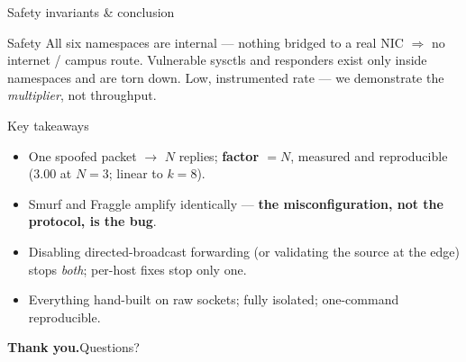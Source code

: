 \documentclass[aspectratio=169,10pt]{beamer}
\begin{document}
\begin{frame}{Safety invariants \& conclusion}
  \begin{block}{Safety}
    \small
    All six namespaces are internal — nothing bridged to a real NIC $\Rightarrow$ no
    internet / campus route. Vulnerable sysctls and responders exist only inside
    namespaces and are torn down. Low, instrumented rate — we demonstrate the
    \emph{multiplier}, not throughput.
  \end{block}
  \begin{block}{Key takeaways}
    \begin{itemize}\small
      \item One spoofed packet $\rightarrow$ $N$ replies; \textbf{factor $=N$}, measured
            and reproducible (3.00 at $N{=}3$; linear to $k{=}8$).
      \item Smurf and Fraggle amplify identically — \textbf{the misconfiguration, not the
            protocol, is the bug}.
      \item Disabling directed-broadcast forwarding (or validating the source at the edge)
            stops \emph{both}; per-host fixes stop only one.
      \item Everything hand-built on raw sockets; fully isolated; one-command reproducible.
    \end{itemize}
  \end{block}
  \centering\vspace{2pt}
  {\small\textcolor{primary}{\textbf{Thank you.}}\quad Questions?}
\end{frame}
\end{document}
